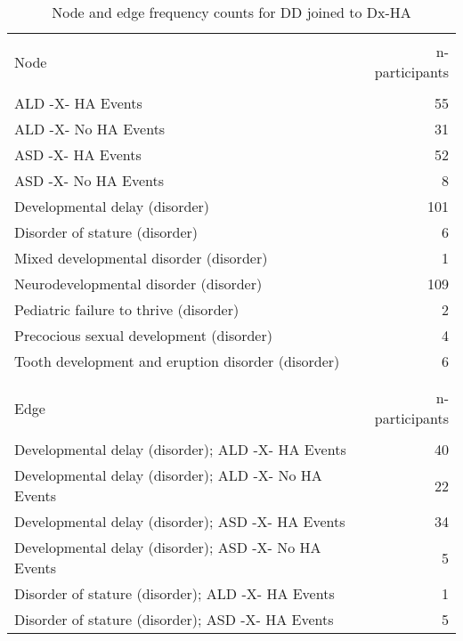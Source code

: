 \documentclass[10pt, letterpaper]{article}
\begin{document}
\begin{spacing}{1.0}
\vspace{20pt}

\begin{small}
    \begin{longtable}[H]{p{5in}r}
        \caption{Node and edge frequency counts for DD joined to Dx-HA}\\
        \hline\\[-8pt]
        Node & n-participants\\
        \hline\\[-6pt]
        ALD -X- HA Events & 55 \\
        \rowcolor{ltBlue}
        ALD -X- No HA Events & 31 \\
        ASD -X- HA Events & 52 \\
        \rowcolor{ltBlue}
        ASD -X- No HA Events & 8 \\
        Developmental delay (disorder) & 101 \\
        \rowcolor{ltBlue}
        Disorder of stature (disorder) & 6 \\
        Mixed developmental disorder (disorder) & 1 \\
        \rowcolor{ltBlue}
        Neurodevelopmental disorder (disorder) & 109 \\
        Pediatric failure to thrive (disorder) & 2 \\
        \rowcolor{ltBlue}
        Precocious sexual development (disorder) & 4 \\
        Tooth development and eruption disorder (disorder) & 6 \\
        &\\[-6pt]
        \hline\\[-8pt]
        Edge & n-participants\\
        \hline\\[-6pt]
        Developmental delay (disorder); ALD -X- HA Events & 40 \\
        \rowcolor{ltBlue}
        Developmental delay (disorder); ALD -X- No HA Events & 22 \\
        Developmental delay (disorder); ASD -X- HA Events & 34 \\
        \rowcolor{ltBlue}
        Developmental delay (disorder); ASD -X- No HA Events & 5 \\
        Disorder of stature (disorder); ALD -X- HA Events & 1 \\
        \rowcolor{ltBlue}
        Disorder of stature (disorder); ASD -X- HA Events & 5 \\

\end{longtable}
\end{small}
\end{spacing}
\end{document}
